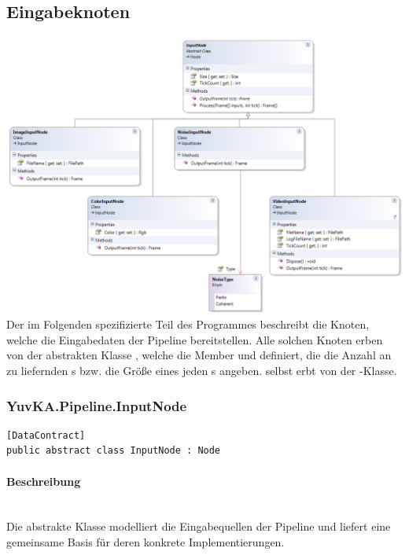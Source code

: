 \subsection{Eingabeknoten}

\includegraphics[width=\textwidth]{YuvKA.Pipeline/inputnodes.png}
Der im Folgenden spezifizierte Teil des Programmes beschreibt die Knoten, welche die Eingabedaten der Pipeline bereitstellen. Alle solchen Knoten erben von der abstrakten Klasse , welche die Member  und  definiert, die die Anzahl an zu liefernden s bzw. die Größe eines jeden s angeben.
 selbst erbt von der -Klasse.


\subsubsection{YuvKA.Pipeline.InputNode}

\begin{verbatim}
[DataContract]
public abstract class InputNode : Node
\end{verbatim}

\paragraph{Beschreibung}~\\
Die abstrakte Klasse  modelliert die Eingabequellen der Pipeline und liefert eine gemeinsame Basis für deren konkrete Implementierungen.


